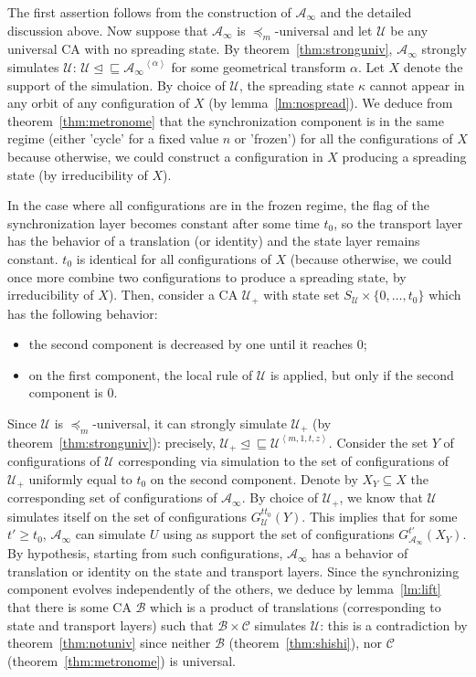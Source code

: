 \documentclass[a4paper]{elsarticle}
\newcommand{\ACA}{\mathcal{A}}
\newcommand{\ACB}{\mathcal{B}}
\newcommand{\ACC}{\mathcal{C}}
\newcommand{\ACU}{\mathcal{U}}
\newcommand\glob[1]{G_{#1}}
\newcommand\alphabe[1]{S_{#1}}
\newcommand\sac{\sqsubseteq}
\newcommand{\fac}{\trianglelefteq}
\newcommand{\facsac}{\fac\!\sac}
\newcommand\bulk[2]{{#1}^{\left\langle{#2}\right\rangle}}
\newcommand{\simu}{\preccurlyeq}
\newcommand{\facsacsimu}{\simu_m}
\newcommand{\limprod}[1]{{\ACA}_\infty}
\begin{document}
\begin{pf}
  The first assertion follows from the construction of $\limprod{\ACA}$ and the
  detailed discussion above. Now suppose that $\limprod{\ACA}$ is
  $\facsacsimu$-universal and let $\ACU$ be any universal CA with no spreading
  state. By theorem~\ref{thm:stronguniv}, $\limprod{\ACA}$ strongly simulates
  $\ACU$: ${\ACU\facsac\bulk{\limprod{\ACA}}{\alpha}}$ for some geometrical
  transform $\alpha$. Let $X$ denote the support of the simulation. By choice of
  $\ACU$, the spreading state $\kappa$ cannot appear in any orbit of any
  configuration of $X$ (by lemma~\ref{lm:nospread}). We deduce from
  theorem~\ref{thm:metronome} that the synchronization component is in the same
  regime (either 'cycle' for a fixed value $n$ or 'frozen') for all the
  configurations of $X$ because otherwise, we could construct a configuration in
  $X$ producing a spreading state (by irreducibility of $X$).

  In the case where all configurations are in the frozen regime, the
  flag of the synchronization layer becomes constant after some time
  $t_0$, so the transport layer has the behavior of a translation (or
  identity) and the state layer remains constant. $t_0$ is identical
  for all configurations of $X$ (because otherwise, we could once more
  combine two configurations to produce a spreading state, by
  irreducibility of $X$). Then, consider a CA $\ACU_+$ with state set
  ${\alphabe{\ACU}\times\{0,\ldots,t_0\}}$ which has the following
  behavior:
  \begin{itemize}
  \item the second component is decreased by one until it reaches $0$;
  \item on the first component, the local rule of $\ACU$ is applied,
    but only if the second component is $0$.
  \end{itemize}
  Since $\ACU$ is $\facsacsimu$-universal, it can strongly simulate
  $\ACU_+$ (by theorem~\ref{thm:stronguniv}): precisely,
  ${\ACU_+\facsac\bulk{\ACU}{m,1,t,z}}$. Consider the set $Y$ of
  configurations of $\ACU$ corresponding via simulation to the set of
  configurations of $\ACU_+$ uniformly equal to $t_0$ on the second
  component. Denote by ${X_Y\subseteq X}$ the corresponding set of
  configurations of $\limprod{\ACA}$. By choice of $\ACU_+$, we know
  that $\ACU$ simulates itself on the set of configurations
  ${\glob{\ACU}^{tt_0}(Y)}$. This implies that for some ${t'\geq
    t_0}$, $\limprod{\ACA}$ can simulate $U$ using as support the set
  of configurations ${\glob{\limprod{\ACA}}^{t'}(X_Y)}$. By hypothesis,
  starting from such configurations, $\limprod{\ACA}$ has a behavior
  of translation or identity on the state and transport layers. Since
  the synchronizing component evolves independently of the others, we
  deduce by lemma~\ref{lm:lift} that there is some CA $\ACB$ which is
  a product of translations (corresponding to state and transport
  layers) such that ${\ACB\times\ACC}$ simulates $\ACU$: this is a
  contradiction by theorem~\ref{thm:notuniv} since neither $\ACB$
  (theorem~\ref{thm:shishi}), nor $\ACC$
  (theorem~\ref{thm:metronome}) is universal.


\end{pf}
\end{document}
